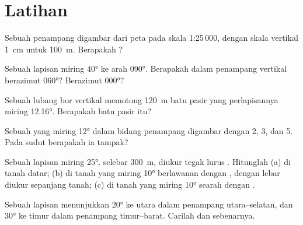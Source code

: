 \section{Latihan}

\begin{exercise}[$\star$]\label{exo:b1:cross-sections:1}
Sebuah penampang digambar dari peta pada skala 1:25\,000, dengan skala vertikal \qty{1}{cm} untuk \qty{100}{m}. Berapakah ?
\end{exercise}

\begin{exercise}[$\star$]\label{exo:b1:cross-sections:2}
Sebuah lapisan miring \ang{40} ke arah \ang{090}. Berapakah  dalam penampang vertikal berazimut \ang{060}? Berazimut \ang{000}?
\end{exercise}

\begin{exercise}[$\star$]\label{exo:b1:cross-sections:3}
Sebuah lubang bor vertikal memotong \qty{120}{m} batu pasir yang perlapisannya miring \ang{12.16}. Berapakah  batu pasir itu?
\end{exercise}

\begin{exercise}[$\star$]\label{exo:b1:cross-sections:4}
Sebuah  yang miring \ang{12} dalam bidang penampang digambar dengan  2, 3, dan 5. Pada sudut berapakah ia tampak?
\end{exercise}

\begin{exercise}[$\star\star$]\label{exo:b1:cross-sections:5}
Sebuah lapisan miring \ang{25}.  selebar \qty{300}{m}, diukur tegak lurus . Hitunglah  (a) di tanah datar; (b) di tanah yang miring \ang{10} berlawanan dengan , dengan lebar diukur sepanjang tanah; (c) di tanah yang miring \ang{10} searah dengan .
\end{exercise}

\begin{exercise}[$\star\star$]\label{exo:b1:cross-sections:6}
Sebuah lapisan menunjukkan  \ang{20} ke utara dalam penampang utara--selatan, dan \ang{30} ke timur dalam penampang timur--barat. Carilah  dan  sebenarnya.
\end{exercise}

